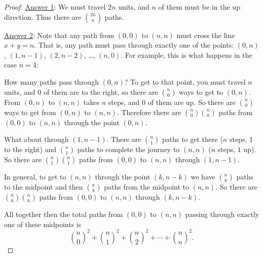 \documentclass[12pt]{article}
\begin{document}
\begin{example}
\begin{solution}
\begin{proof}
      \underline{Answer 1}: We must travel $2n$ units, and $n$ of them must be in the up direction.  Thus there are ${2n \choose n}$ paths.

      \underline{Answer 2}: Note that any path from $(0,0)$ to $(n,n)$ must cross the line $x + y = n$.  That is, any path must pass through exactly one of the points: $(0,n)$, $(1,n-1)$, $(2,n-2)$, \ldots, $(n, 0)$.  For example, this is what happens in the case $n = 4$:

    \begin{center}
   \end{center}

     How many paths pass through $(0,n)$?  To get to that point, you must travel $n$ units, and $0$ of them are to the right, so there are ${n \choose 0}$ ways to get to $(0,n)$.  From $(0,n)$ to $(n,n)$ takes $n$ steps, and $0$ of them are up.  So there are ${n \choose 0}$ ways to get from $(0,n)$ to $(n,n)$.  Therefore there are ${n \choose 0}{n \choose 0}$ paths from $(0,0)$ to $(n,n)$ through the point $(0,n)$.

     What about through $(1,n-1)$.  There are ${n \choose 1}$ paths to get there ($n$ steps, 1 to the right) and ${n \choose 1}$ paths to complete the journey to $(n,n)$ ($n$ steps, $1$ up).  So there are ${n \choose 1}{n \choose 1}$ paths from $(0,0)$ to $(n,n)$ through $(1,n-1)$.

     In general, to get to $(n,n)$ through the point $(k,n-k)$ we have ${n \choose k}$ paths to the midpoint and then ${n \choose k}$ paths from the midpoint to $(n,n)$.  So there are ${n \choose k}{n \choose k}$ paths from $(0,0)$ to $(n,n)$ through $(k, n-k)$.

     All together then the total paths from $(0,0)$ to $(n,n)$ passing through exactly one of these midpoints is
     \[{n \choose 0}^2 + {n \choose 1}^2 + {n \choose 2}^2 + \cdots + {n \choose n}^2.\]
   \end{proof}
  \end{solution}
\end{example}
\end{document}
